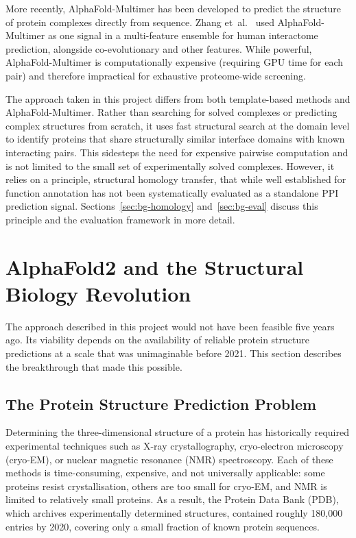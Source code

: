 More recently, AlphaFold-Multimer has been developed to predict the structure of protein complexes directly from sequence.
Zhang et~al.~\cite{zhang2025ppi} used AlphaFold-Multimer as one signal in a multi-feature ensemble for human interactome prediction, alongside co-evolutionary and other features.
While powerful, AlphaFold-Multimer is computationally expensive (requiring GPU time for each pair) and therefore impractical for exhaustive proteome-wide screening.

The approach taken in this project differs from both template-based methods and AlphaFold-Multimer.
Rather than searching for solved complexes or predicting complex structures from scratch, it uses fast structural search at the domain level to identify proteins that share structurally similar interface domains with known interacting pairs.
This sidesteps the need for expensive pairwise computation and is not limited to the small set of experimentally solved complexes.
However, it relies on a principle, structural homology transfer, that while well established for function annotation has not been systematically evaluated as a standalone PPI prediction signal.
Sections~\ref{sec:bg-homology} and~\ref{sec:bg-eval} discuss this principle and the evaluation framework in more detail.


\section{AlphaFold2 and the Structural Biology Revolution}
\label{sec:bg-alphafold}

The approach described in this project would not have been feasible five years ago.
Its viability depends on the availability of reliable protein structure predictions at a scale that was unimaginable before 2021.
This section describes the breakthrough that made this possible.

\subsection{The Protein Structure Prediction Problem}

Determining the three-dimensional structure of a protein has historically required experimental techniques such as X-ray crystallography, cryo-electron microscopy (cryo-EM), or nuclear magnetic resonance (NMR) spectroscopy.
Each of these methods is time-consuming, expensive, and not universally applicable: some proteins resist crystallisation, others are too small for cryo-EM, and NMR is limited to relatively small proteins.
As a result, the Protein Data Bank (PDB), which archives experimentally determined structures, contained roughly 180,000 entries by 2020, covering only a small fraction of known protein sequences.

